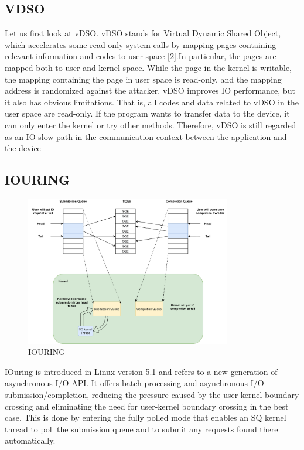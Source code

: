 \subsection{VDSO}
Let us first look at vDSO. vDSO stands for Virtual Dynamic Shared Object, 
which accelerates some read-only system calls by mapping pages containing 
relevant information and codes to user space [2].In particular, the pages are 
mapped both to user and kernel space. While the page in the kernel is writable, 
the mapping containing the page in user space is read-only, and the mapping address 
is randomized against the attacker.  vDSO improves IO performance, 
but it also has obvious limitations. That is, all codes and data related to vDSO in 
the user space are read-only. If the program wants to transfer data to the device, 
it can only enter the kernel or try other methods. Therefore, vDSO is still regarded as an 
IO slow path in the communication context between the application and the device

\subsection{IOURING}
\begin{figure}[tbp]
  \centering
  \includegraphics[width=0.8\textwidth]{images/IOURING}
  \caption[Short description]{IOURING}
  \label{fig:IOURING}
\end{figure}
IOuring is introduced in Linux version 5.1 and refers to a new generation of asynchronous I/O API. It offers batch processing and asynchronous I/O submission/completion,  reducing the pressure caused by the user-kernel boundary crossing and eliminating the need for user-kernel boundary crossing in the best case. This is done by entering the fully polled mode that enables an SQ kernel thread to poll the submission queue and to submit any requests found there\cite{Jonathan} automatically.  

